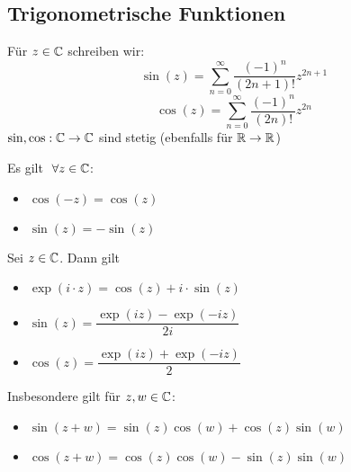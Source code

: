 \documentclass[main.tex]{subfiles}
\begin{document}
\subsection{Trigonometrische Funktionen}

\begin{Definition}
  Für $z \in \mathbb{C}$ schreiben wir:
  $$\sin(z) = \sum \limits_{n=0}^\infty \dfrac{(-1)^n}{(2n+1)!} z^{2n+1}$$
  $$\cos(z) = \sum \limits_{n=0}^\infty \dfrac{(-1)^n}{(2n)!} z^{2n}$$
  $\sin,\cos: \mathbb{C} \to \mathbb{C}$ sind stetig (ebenfalls für $\mathbb{R} \to \mathbb{R}$)
  \begin{Theorem}
    Es gilt $\;\forall z \in \mathbb{C}$:
    \begin{itemize}
      \item $\cos(-z) = \cos(z)$
      \item $\sin(z) = -\sin(z)$
    \end{itemize}
  \end{Theorem}
\end{Definition}

\begin{Theorem}
  Sei $z \in \mathbb{C}$. Dann gilt
  \begin{itemize}
    \item $\exp(i\cdot z) = \cos(z) + i \cdot \sin(z)$
    \item $\sin(z) = \dfrac{\exp(iz) - \exp (-iz)}{2i}$
    \item $\cos(z) = \dfrac{\exp(iz) + \exp (-iz)}{2}$
  \end{itemize}
  Insbesondere gilt für $z,w \in \mathbb{C}$:
  \begin{itemize}
    \item $\sin(z+w) = \sin(z)\cos(w) + \cos(z)\sin(w)$
    \item $\cos(z+w) = \cos(z)\cos(w) - \sin(z)\sin(w)$
  \end{itemize}
\end{Theorem}
\end{document}
